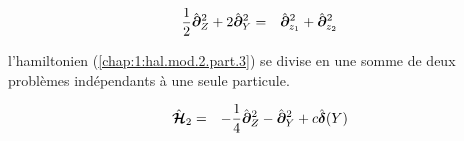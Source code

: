





\begin{eqnarray*}
	\frac{1}{2} \hat{\bm{\partial}}_Z^2 + 	2\hat{\bm{\partial}}_Y^2 & = & \hat{\bm{\partial}}_{z_1}^2 + \hat{\bm{\partial}}_{z_2}^2
\end{eqnarray*}

l'hamiltonien (\ref{chap:1:hal.mod.2.part.3}) se divise en une somme de deux problèmes indépendants à une seule particule.

\begin{eqnarray}\label{chap:1:hal.mod.2.part.4}
	\hat{\bm{\mathcal{H}}}_2 & = & 	-\frac{1}{4} \hat{\bm{\partial}}_Z^2 - 	\hat{\bm{\partial}}_Y^2 + c \hat{\bm{\delta}} ( Y ) 
\end{eqnarray}


